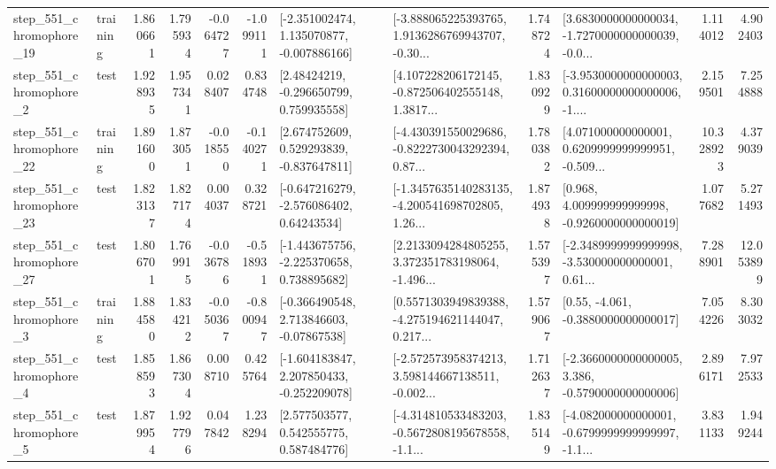 \begin{tabular}{llrrrrllrlrr}
  step\_551\_chromophore\_19 &  training &      1.860661 &    1.795934 &     -0.064727 & -1.099111 &   [-2.351002474, 1.135070877, -0.007886166] &  [-3.888065225393765, 1.9136286769943707, -0.30... &       1.748724 &  [3.6830000000000034, -1.7270000000000039, -0.0... &            1.114012 &          4.902403 \\
   step\_551\_chromophore\_2 &      test &      1.928935 &    1.957341 &      0.028407 &  0.834748 &     [2.48424219, -0.296650799, 0.759935558] &  [4.107228206172145, -0.872506402555148, 1.3817... &       1.830929 &  [-3.9530000000000003, 0.31600000000000006, -1.... &            2.159501 &          7.254888 \\
  step\_551\_chromophore\_22 &  training &      1.891600 &    1.873051 &     -0.018550 & -0.140271 &    [2.674752609, 0.529293839, -0.837647811] &  [-4.430391550029686, -0.8222730043292394, 0.87... &       1.780382 &  [4.071000000000001, 0.6209999999999951, -0.509... &           10.328923 &          4.379039 \\
  step\_551\_chromophore\_23 &      test &      1.823137 &    1.827174 &      0.004037 &  0.328721 &    [-0.647216279, -2.576086402, 0.64243534] &  [-1.3457635140283135, -4.200541698702805, 1.26... &       1.874938 &    [0.968, 4.009999999999998, -0.9260000000000019] &            1.077682 &          5.271493 \\
  step\_551\_chromophore\_27 &      test &      1.806701 &    1.769915 &     -0.036786 & -0.518931 &   [-1.443675756, -2.225370658, 0.738895682] &  [2.2133094284805255, 3.372351783198064, -1.496... &       1.575397 &  [-2.3489999999999998, -3.530000000000001, 0.61... &            7.288901 &         12.053899 \\
   step\_551\_chromophore\_3 &  training &      1.884580 &    1.834212 &     -0.050367 & -0.800947 &    [-0.366490548, 2.713846603, -0.07867538] &  [0.5571303949839388, -4.275194621144047, 0.217... &       1.579067 &                [0.55, -4.061, -0.3880000000000017] &            7.054226 &          8.303032 \\
   step\_551\_chromophore\_4 &      test &      1.858593 &    1.867304 &      0.008710 &  0.425764 &   [-1.604183847, 2.207850433, -0.252209078] &  [-2.572573958374213, 3.598144667138511, -0.002... &       1.712637 &  [-2.3660000000000005, 3.386, -0.5790000000000006] &            2.896171 &          7.972533 \\
   step\_551\_chromophore\_5 &      test &      1.879954 &    1.927796 &      0.047842 &  1.238294 &     [2.577503577, 0.542555775, 0.587484776] &  [-4.314810533483203, -0.5672808195678558, -1.1... &       1.835149 &  [-4.082000000000001, -0.6799999999999997, -1.1... &            3.831133 &          1.949244 \\

\end{tabular}

